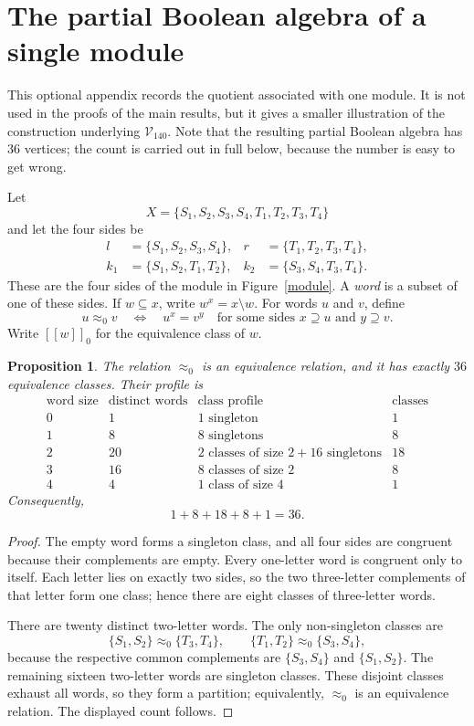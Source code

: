 \documentclass{article}   	%
\theoremstyle{plain}
\newtheorem{proposition}[theorem]{Proposition}
\theoremstyle{definition}
\theoremstyle{remark}
\begin{document}
\section{The partial Boolean algebra of a single module}
\label{app:single-module}

This optional appendix records the quotient associated with one module.  It is
not used in the proofs of the main results, but it gives a smaller illustration
of the construction underlying $\mathcal V_{140}$.  Note that the resulting
partial Boolean algebra has $36$ vertices; the count is carried out in full
below, because the number is easy to get wrong.

Let
\[
X=\{S_1,S_2,S_3,S_4,T_1,T_2,T_3,T_4\}
\]
and let the four sides be
\[
\begin{aligned}
l&=\{S_1,S_2,S_3,S_4\},
& r&=\{T_1,T_2,T_3,T_4\},\\
k_1&=\{S_1,S_2,T_1,T_2\},
& k_2&=\{S_3,S_4,T_3,T_4\}.
\end{aligned}
\]
These are the four sides of the module in Figure~\ref{module}.  A \emph{word}
is a subset of one of these sides.  If $w\subseteq x$, write
$w^x=x\setminus w$.  For words $u$ and $v$, define
\[
u\approx_0 v
\quad\Longleftrightarrow\quad
u^x=v^y
\quad\text{for some sides }x\supseteq u\text{ and }y\supseteq v.
\]
Write $[[w]]_0$ for the equivalence class of $w$.

\begin{proposition}
\label{prop:single-module-count}
The relation $\approx_0$ is an equivalence relation, and it has exactly
$36$ equivalence classes.  Their profile is
\[
\begin{array}{c|c|c|c}
\text{word size}&\text{distinct words}&\text{class profile}&\text{classes}\\ \hline
0&1&1\text{ singleton}&1\\
1&8&8\text{ singletons}&8\\
2&20&2\text{ classes of size }2+16\text{ singletons}&18\\
3&16&8\text{ classes of size }2&8\\
4&4&1\text{ class of size }4&1
\end{array}
\]
Consequently,
\[
1+8+18+8+1=36.
\]
\end{proposition}

\begin{proof}
The empty word forms a singleton class, and all four sides are congruent because
their complements are empty.  Every one-letter word is congruent only to
itself.  Each letter lies on exactly two sides, so the two three-letter
complements of that letter form one class; hence there are eight classes of
three-letter words.

There are twenty distinct two-letter words.  The only non-singleton classes are
\[
\{S_1,S_2\}\approx_0\{T_3,T_4\},
\qquad
\{T_1,T_2\}\approx_0\{S_3,S_4\},
\]
because the respective common complements are $\{S_3,S_4\}$ and
$\{S_1,S_2\}$.  The remaining sixteen two-letter words are singleton classes.
These disjoint classes exhaust all words, so they form a partition; equivalently,
$\approx_0$ is an equivalence relation.  The displayed count follows.
\end{proof}
\end{document}

